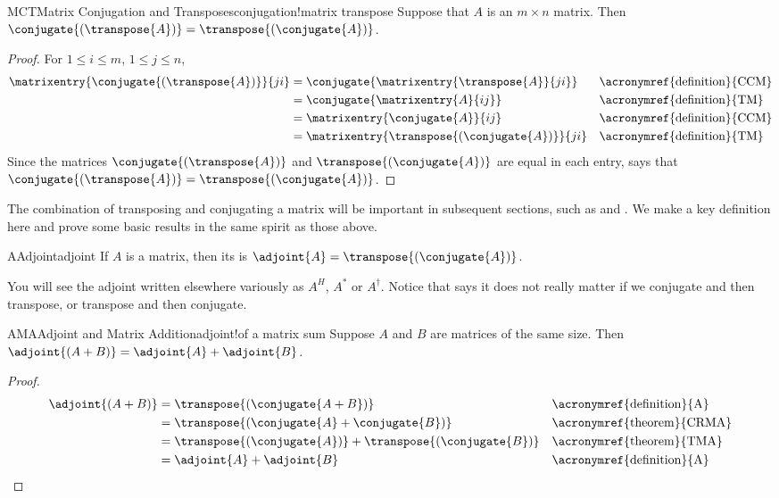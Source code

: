 %
\begin{theorem}{MCT}{Matrix Conjugation and Transposes}{conjugation!matrix transpose}
Suppose that $A$ is an $m\times n$ matrix.  Then $\conjugate{\left(\transpose{A}\right)}=\transpose{\left(\conjugate{A}\right)}$.
\end{theorem}
%
\begin{proof}
%
For $1\leq i\leq m$, $1\leq j\leq n$,
%
\begin{align*}
%
\matrixentry{\conjugate{\left(\transpose{A}\right)}}{ji}
%
&=\conjugate{\matrixentry{\transpose{A}}{ji}}
&&\text{\acronymref{definition}{CCM}}\\
%
&=\conjugate{\matrixentry{A}{ij}}
&&\text{\acronymref{definition}{TM}}\\
%
&=\matrixentry{\conjugate{A}}{ij}
&&\text{\acronymref{definition}{CCM}}\\
%
&=\matrixentry{\transpose{\left(\conjugate{A}\right)}}{ji}
&&\text{\acronymref{definition}{TM}}\\
%
\end{align*}
%
Since the matrices  $\conjugate{\left(\transpose{A}\right)}$ and $\transpose{\left(\conjugate{A}\right)}$  are equal in each entry,  says that $\conjugate{\left(\transpose{A}\right)}=\transpose{\left(\conjugate{A}\right)}$.
%
\end{proof}
%
%
The combination of transposing and conjugating a matrix will be important in subsequent sections, such as  and .  We make a key definition here and prove some basic results in the same spirit as those above.
%
\begin{definition}{A}{Adjoint}{adjoint}
If $A$ is a matrix, then its  is 
$\adjoint{A}=\transpose{\left(\conjugate{A}\right)}$.
\end{definition}
%
You will see the adjoint written elsewhere variously as $A^H$, $A^\ast$ or $A^\dagger$.  Notice that  says it does not really matter if we conjugate and then transpose, or transpose and then conjugate.
%
\begin{theorem}{AMA}{Adjoint and Matrix Addition}{adjoint!of a matrix sum}
Suppose $A$ and $B$ are matrices of the same size.  Then $\adjoint{\left(A+B\right)}=\adjoint{A}+\adjoint{B}$.
\end{theorem}
%
\begin{proof}
%
\begin{align*}
\adjoint{\left(A+B\right)}
&=\transpose{\left(\conjugate{A+B}\right)}
&&\text{\acronymref{definition}{A}}\\
%
&=\transpose{\left(\conjugate{A}+\conjugate{B}\right)}
&&\text{\acronymref{theorem}{CRMA}}\\
%
&=\transpose{\left(\conjugate{A}\right)}+\transpose{\left(\conjugate{B}\right)}
&&\text{\acronymref{theorem}{TMA}}\\
%
&=\adjoint{A}+\adjoint{B}
&&\text{\acronymref{definition}{A}}
%
\end{align*}
%
\end{proof}
